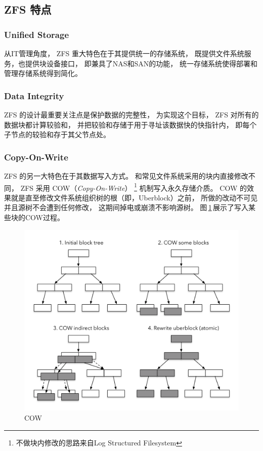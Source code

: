 \subsection{ZFS 特点}
\subsubsection{Unified Storage}
从IT管理角度，
ZFS 重大特色在于其提供统一的存储系统，
既提供文件系统服务，也提供块设备接口，
即兼具了NAS和SAN的功能，
统一存储系统使得部署和管理存储系统得到简化。

\subsubsection{Data Integrity}
ZFS 的设计最重要关注点是保护数据的完整性，
为实现这个目标，
ZFS 对所有的数据块都计算较验和，
并把较验和存储于用于寻址该数据快的快指针内，
即每个子节点的较验和存于其父节点处。

\subsubsection{Copy-On-Write}
ZFS 的另一大特色在于其数据写入方式。
和常见文件系统采用的块内直接修改不同，
ZFS 采用 COW（{\em Copy-On-Write}）%
\footnote{不做块内修改的思路来自{Log Structured Filesystem}}
机制写入永久存储介质。
COW 的效果就是直至修改文件系统组织树的根（即，Uberblock）之前，
所做的改动不可见并且源树不会遭到任何修改，
这期间掉电或崩溃不影响源树。
图\,\ref{fig:cow}\,展示了写入某些块的COW过程。

\begin{figure}[!ht]
  \centering
  \includegraphics[width=\textwidth]{fig/zfs_cow.pdf}
  \caption{COW}\label{fig:cow}
\end{figure}


